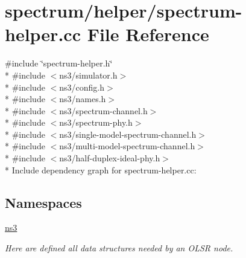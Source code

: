 \hypertarget{spectrum-helper_8cc}{}\section{spectrum/helper/spectrum-\/helper.cc File Reference}
\label{spectrum-helper_8cc}
{\ttfamily \#include \char`\"{}spectrum-\/helper.\+h\char`\"{}}\\*
{\ttfamily \#include $<$ns3/simulator.\+h$>$}\\*
{\ttfamily \#include $<$ns3/config.\+h$>$}\\*
{\ttfamily \#include $<$ns3/names.\+h$>$}\\*
{\ttfamily \#include $<$ns3/spectrum-\/channel.\+h$>$}\\*
{\ttfamily \#include $<$ns3/spectrum-\/phy.\+h$>$}\\*
{\ttfamily \#include $<$ns3/single-\/model-\/spectrum-\/channel.\+h$>$}\\*
{\ttfamily \#include $<$ns3/multi-\/model-\/spectrum-\/channel.\+h$>$}\\*
{\ttfamily \#include $<$ns3/half-\/duplex-\/ideal-\/phy.\+h$>$}\\*
Include dependency graph for spectrum-\/helper.cc\+:
\subsection*{Namespaces}
\begin{DoxyCompactItemize}
\item 
 \hyperlink{namespacens3}{ns3}
\begin{DoxyCompactList}\small\item\em Here are defined all data structures needed by an O\+L\+SR node. \end{DoxyCompactList}\end{DoxyCompactItemize}
